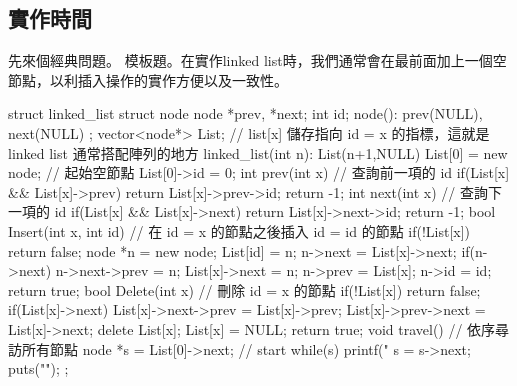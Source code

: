 \documentclass[main.tex]{subfiles}
\begin{document}
 \subsection{實作時間}
 先來個經典問題。
 模板題。在實作linked list時，我們通常會在最前面加上一個空節點，以利插入操作的實作方便以及一致性。
 \begin{C++}
struct linked_list {
    struct node {
        node *prev, *next;
        int id;
        node(): prev(NULL), next(NULL){}
    };
    vector<node*> List;
    // list[x] 儲存指向 id = x 的指標，這就是 linked list 通常搭配陣列的地方
    linked_list(int n): List(n+1,NULL) {
        List[0] = new node; // 起始空節點
        List[0]->id = 0;
    }
    int prev(int x){ // 查詢前一項的 id
        if(List[x] && List[x]->prev)
        	return List[x]->prev->id;
        return -1;
    }
    int next(int x){ // 查詢下一項的 id
        if(List[x] && List[x]->next)
        	return List[x]->next->id;
        return -1;
    }
    bool Insert(int x, int id) {
        // 在 id = x 的節點之後插入 id = id 的節點
        if(!List[x]) return false;
        node *n = new node;
        List[id] = n;
        n->next = List[x]->next;
        if(n->next) n->next->prev = n;
        List[x]->next = n;
        n->prev = List[x];
        n->id = id;
        return true;
    }
    bool Delete(int x){
        // 刪除 id = x 的節點
        if(!List[x]) return false;
        if(List[x]->next)
        	List[x]->next->prev = List[x]->prev;
        List[x]->prev->next = List[x]->next;
        delete List[x];
        List[x] = NULL;
        return true;
    }
    void travel(){ // 依序尋訪所有節點
        node *s = List[0]->next; // start
        while(s){
            printf("%
            s = s->next;
        }
        puts("");
    }
};
 \end{C++}
\end{document}
